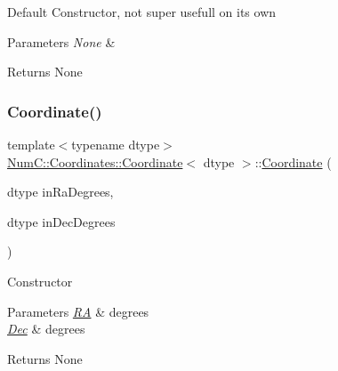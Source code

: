 Default Constructor, not super usefull on its own


\begin{DoxyParams}{Parameters}
{\em None} & \\
\hline
\end{DoxyParams}
\begin{DoxyReturn}{Returns}
None 
\end{DoxyReturn}
\mbox{\label{class_num_c_1_1_coordinates_1_1_coordinate_a64de27c4f1b7713c17e0335d75ec92c3}} 
\subsubsection{\texorpdfstring{Coordinate()}{Coordinate()}\hspace{0.1cm}{\footnotesize\ttfamily [2/6]}}
{\footnotesize\ttfamily template$<$typename dtype$>$ \\
\mbox{\hyperlink{class_num_c_1_1_coordinates_1_1_coordinate}{Num\+C\+::\+Coordinates\+::\+Coordinate}}$<$ dtype $>$\+::\mbox{\hyperlink{class_num_c_1_1_coordinates_1_1_coordinate}{Coordinate}} (\begin{DoxyParamCaption}\item[{dtype}]{in\+Ra\+Degrees,  }\item[{dtype}]{in\+Dec\+Degrees }\end{DoxyParamCaption})\hspace{0.3cm}{\ttfamily [inline]}}

Constructor


\begin{DoxyParams}{Parameters}
{\em \mbox{\hyperlink{class_num_c_1_1_coordinates_1_1_r_a}{RA}}} & degrees \\
\hline
{\em \mbox{\hyperlink{class_num_c_1_1_coordinates_1_1_dec}{Dec}}} & degrees\\
\hline
\end{DoxyParams}
\begin{DoxyReturn}{Returns}
None 
\end{DoxyReturn}
\mbox{\label{class_num_c_1_1_coordinates_1_1_coordinate_ac41f6813f65934fedb7f9a10b5ed90d6}} 
